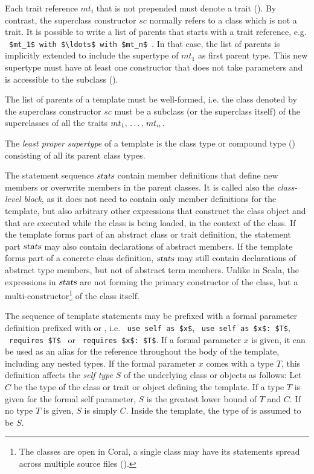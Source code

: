 Each trait reference $mt_i$ that is not prepended must denote a trait (). By contrast, the superclass constructor $sc$ normally refers to a class which is not a trait. It is possible to write a list of parents that starts with a trait reference, e.g. ~\lstinline!$mt_1$ with $\ldots$ with $mt_n$!~. In that case, the list of parents is implicitly extended to include the supertype of $mt_1$ as first parent type. This new supertype must have at least one constructor that does not take parameters and is accessible to the subclass (). 

The list of parents of a template must be well-formed, i.e. the class denoted by the superclass constructor $sc$ must be a subclass (or the superclass itself) of the superclasses of all the traits $mt_1 ,\, \ldots ,\, mt_n$. 

The {\em least proper supertype} of a template is the class type or compound type () consisting of all its parent class types. 

The statement sequence $\mbox{\sl stats}$ contain member definitions that define new members or overwrite members in the parent classes. It is called also the {\em class-level block}, as it does not need to contain only member definitions for the template, but also arbitrary other expressions that construct the class object and that are executed while the class is being loaded, in the context of the class. If the template forms part of an abstract class or trait definition, the statement part $\mbox{\sl stats}$ may also contain declarations of abstract members. If the template forms part of a concrete class definition, $\mbox{\sl stats}$ may still contain declarations of abstract type members, but not of abstract term members. Unlike in Scala, the expressions in $\mbox{\sl stats}$ are not forming the primary constructor of the class, but a multi-constructor\footnote{The classes are open in Coral, a single class may have its statements spread across multiple source files ().} of the class itself. 

The sequence of template statements may be prefixed with a formal parameter definition prefixed with  or , i.e. ~\lstinline!use self as $x$!, ~\lstinline!use self as $x$: $T$!, ~\lstinline!requires $T$!~ or ~\lstinline!requires $x$: $T$!. If a formal parameter $x$ is given, it can be used as an alias for the reference  throughout the body of the template, including any nested types. If the formal parameter $x$ comes with a type $T$, this definition affects the {\em self type} $S$ of the underlying class or objects as follows: Let $C$ be the type of the class or trait or object defining the template. If a type $T$ is given for the formal self parameter, $S$ is the greatest lower bound of $T$ and $C$. If no type $T$ is given, $S$ is simply $C$. Inside the template, the type of  is assumed to be $S$. 

